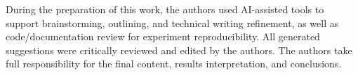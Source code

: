 During the preparation of this work, the authors used AI-assisted tools to support brainstorming, outlining, and technical writing refinement, as well as code/documentation review for experiment reproducibility. All generated suggestions were critically reviewed and edited by the authors. The authors take full responsibility for the final content, results interpretation, and conclusions.
